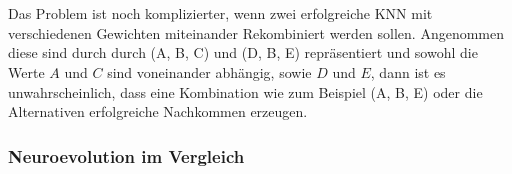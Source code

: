 \\\\
Das Problem ist noch komplizierter, wenn zwei erfolgreiche \ac{KNN} mit verschiedenen Gewichten miteinander Rekombiniert werden sollen. Angenommen diese sind durch durch (A, B, C) und (D, B, E) repräsentiert und sowohl die Werte $A$ und $C$ sind voneinander abhängig, sowie $D$ und $E$, dann ist es unwahrscheinlich, dass eine Kombination wie zum Beispiel (A, B, E) oder die Alternativen erfolgreiche Nachkommen erzeugen. 




\subsubsection{Neuroevolution im Vergleich}


